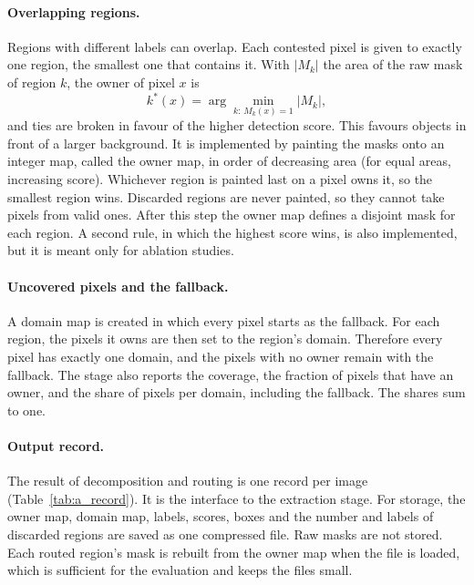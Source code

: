 \documentclass{FastFyp}
\begin{document}
\paragraph{Overlapping regions.} Regions with different labels can overlap. Each contested pixel is given to exactly one region, the smallest one that contains it. With $|M_k|$ the area of the raw mask of region $k$, the owner of pixel $x$ is
\begin{equation}
k^{*}(x)=\arg\min_{k:\,M_k(x)=1}|M_k|,
\end{equation}
and ties are broken in favour of the higher detection score. This favours objects in front of a larger background. It is implemented by painting the masks onto an integer map, called the owner map, in order of decreasing area (for equal areas, increasing score). Whichever region is painted last on a pixel owns it, so the smallest region wins. Discarded regions are never painted, so they cannot take pixels from valid ones. After this step the owner map defines a disjoint mask for each region. A second rule, in which the highest score wins, is also implemented, but it is meant only for ablation studies.
 
\paragraph{Uncovered pixels and the fallback.} A domain map is created in which every pixel starts as the fallback. For each region, the pixels it owns are then set to the region's domain. Therefore every pixel has exactly one domain, and the pixels with no owner remain with the fallback. The stage also reports the coverage, the fraction of pixels that have an owner, and the share of pixels per domain, including the fallback. The shares sum to one.
 
\paragraph{Output record.} The result of decomposition and routing is one record per image (Table~\ref{tab:a_record}). It is the interface to the extraction stage. For storage, the owner map, domain map, labels, scores, boxes and the number and labels of discarded regions are saved as one compressed file. Raw masks are not stored. Each routed region's mask is rebuilt from the owner map when the file is loaded, which is sufficient for the evaluation and keeps the files small.
 
\end{document}
